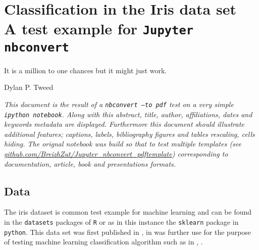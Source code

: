 



    
    
\chapter[Classification in the Iris data set]{Classification in the Iris data set\\ A test example for {\tt Jupyter nbconvert}}
    	  \epigraph{It is a million to one chances but it might just work.}{Dylan P. Tweed}

    
    
\begin{center}
\parbox{\abstractwidth}{\it
This document is the result of a {\tt nbconvert --to pdf} test on a very simple {\tt ipython notebook}. Along with this abstract, title, author, affiliations, dates and keywords metadata are displayed. Furthermore this document should illustrate additional features; captions, labels, bibliography figures and tables rescaling, cells hiding. The orignal notebook was build so that to test multiple templates (see \href{https://github.com/BreizhZut/Jupyter_nbconvert_pdftemplate.git}{github.com/BreizhZut/Jupyter\_nbconvert\_pdftemplate}) corresponding to documentation, article, book and presentations formats.
}
\end{center}
\par\vspace{\abstractsep}%
    
    








\section{Data}\label{data}

The iris dataset is common test example for machine learning and can be
found in the \texttt{datasets} packages of \texttt{R} or as in this
instance the \texttt{sklearn} package in \texttt{python}. This data set
was first published in \cite{Fisher1936}, in was further use for the
purpose of testing machine learning classification algorithm such as in
\cite{RoHart1973}, \cite{Dasarathy1980}.


